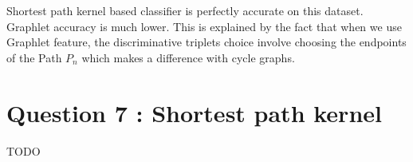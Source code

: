 \documentclass[a4paper]{article}
\begin{document}
Shortest path kernel based classifier is perfectly accurate on this dataset. Graphlet accuracy is much lower.
This is explained by the fact that when we use Graphlet feature, the discriminative triplets choice
involve choosing the endpoints of the Path $P_n$ which makes a difference with cycle graphs.


\section{Question 7 : Shortest path kernel}
TODO



\end{document}
